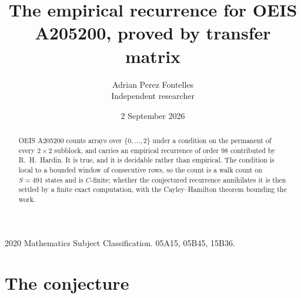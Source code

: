 \documentclass[11pt,a4paper]{article}
\title{The empirical recurrence for OEIS A205200, proved by transfer matrix}
\author{Adrian Perez Fontelles\\ \small Independent researcher}
\date{2 September 2026}
\theoremstyle{plain}
\theoremstyle{definition}
\begin{document}
\maketitle

\begin{abstract}
OEIS A205200 counts arrays over $\{0,\dots,2\}$ under a condition on the permanent of every
$2\times2$ subblock, and carries an empirical recurrence of order $98$ contributed by
R.~H.~Hardin. It is true, and it is decidable rather than empirical. The condition is local to
a bounded window of consecutive rows, so the count is a walk count on $S=491$ states and is
$C$-finite; whether the conjectured recurrence annihilates it is then settled by a finite exact
computation, with the Cayley--Hamilton theorem bounding the work.
\end{abstract}

\noindent\small 2020 Mathematics Subject Classification. 05A15, 05B45, 15B36.\normalsize

\section{The conjecture}
\end{document}
